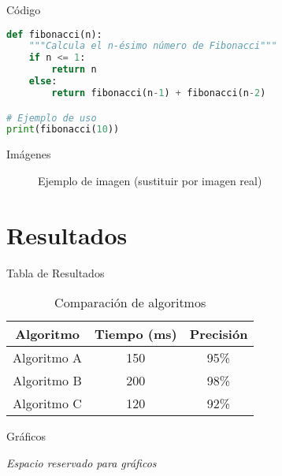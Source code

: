 \documentclass[aspectratio=169]{beamer}
\begin{document}
\begin{frame}[fragile]{Código}
    \begin{lstlisting}[language=Python, caption=Ejemplo de código Python]
def fibonacci(n):
    """Calcula el n-ésimo número de Fibonacci"""
    if n <= 1:
        return n
    else:
        return fibonacci(n-1) + fibonacci(n-2)

# Ejemplo de uso
print(fibonacci(10))
    \end{lstlisting}
\end{frame}

\begin{frame}{Imágenes}
    \begin{figure}
        \centering
        \caption{Ejemplo de imagen (sustituir por imagen real)}
    \end{figure}
\end{frame}

\section{Resultados}

\begin{frame}{Tabla de Resultados}
    \begin{table}
        \centering
        \begin{tabular}{|c|c|c|}
            \hline
            \textbf{Algoritmo} & \textbf{Tiempo (ms)} & \textbf{Precisión} \\
            \hline
            Algoritmo A & 150 & 95\% \\
            \hline
            Algoritmo B & 200 & 98\% \\
            \hline
            Algoritmo C & 120 & 92\% \\
            \hline
        \end{tabular}
        \caption{Comparación de algoritmos}
    \end{table}
\end{frame}

\begin{frame}{Gráficos}
    \begin{center}
        \textit{Espacio reservado para gráficos}
    \end{center}
\end{frame}
\end{document}
